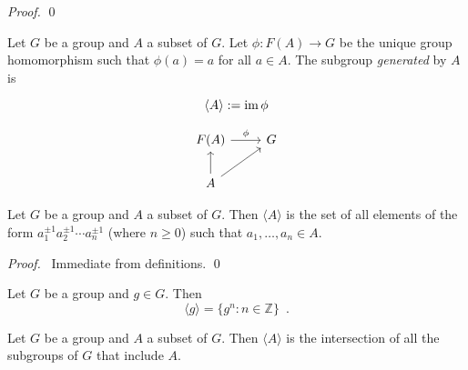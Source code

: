 \begin{proof}
    \pf
    \qed
\end{proof}

\begin{df}
Let $G$ be a group and $A$ a subset of $G$. Let $\phi : F(A) \rightarrow G$ be the unique group homomorphism such that $\phi(a) = a$ for all $a \in A$. The subgroup \emph{generated} by $A$ is

\[ \langle A \rangle := \operatorname{im} \phi \]

\[ \begin{tikzcd}
F(A) \arrow[r,"\phi"] & G \\
A \arrow[u] \arrow[ur]
\end{tikzcd} \]
\end{df}

\begin{prop}
Let $G$ be a group and $A$ a subset of $G$. Then $\langle A \rangle$ is the set of all elements of the form $a_1^{\pm 1} a_2^{\pm 1} \cdots a_n^{\pm 1}$ (where $n \geq 0$) such that $a_1, \ldots, a_n \in A$.
\end{prop}

\begin{proof}
\pf\ Immediate from definitions. \qed
\end{proof}

\begin{cor}
Let $G$ be a group and $g \in G$. Then
\[ \langle g \rangle = \{ g^n : n \in \mathbb{Z} \} \enspace . \]
\end{cor}

\begin{prop}
Let $G$ be a group and $A$ a subset of $G$. Then $\langle A \rangle$ is the intersection of all the subgroups of $G$ that include $A$.
\end{prop}

